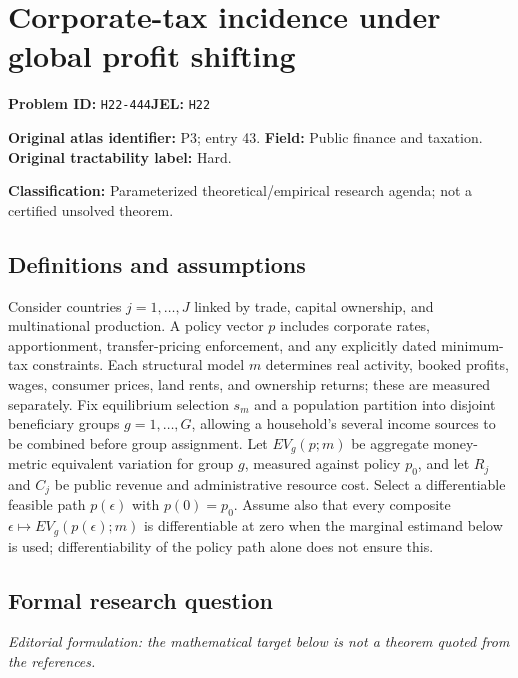 \documentclass[11pt,a4paper]{article}
\begin{document}
\section*{Corporate-tax incidence under global profit shifting}
\textbf{Problem ID:} \texttt{H22-444}\quad \textbf{JEL:} \texttt{H22}\par
\label{problem:OP-0043}
\label{atlas:prob:P3}
\noindent\textbf{Original atlas identifier:} P3; entry 43. \textbf{Field:} Public finance and taxation. \textbf{Original tractability label:} Hard.

\noindent\textbf{Classification:} Parameterized theoretical/empirical research agenda; not a certified unsolved theorem.

\subsection*{Definitions and assumptions}
Consider countries $j=1,\ldots,J$ linked by trade, capital ownership, and multinational production. A policy vector $p$ includes corporate rates, apportionment, transfer-pricing enforcement, and any explicitly dated minimum-tax constraints. Each structural model $m$ determines real activity, booked profits, wages, consumer prices, land rents, and ownership returns; these are measured separately. Fix equilibrium selection $s_m$ and a population partition into disjoint beneficiary groups $g=1,\ldots,G$, allowing a household's several income sources to be combined before group assignment. Let $EV_g(p;m)$ be aggregate money-metric equivalent variation for group $g$, measured against policy $p_0$, and let $R_j$ and $C_j$ be public revenue and administrative resource cost. Select a differentiable feasible path $p(\epsilon)$ with $p(0)=p_0$. Assume also that every composite $\epsilon\mapsto EV_g(p(\epsilon);m)$ is differentiable at zero when the marginal estimand below is used; differentiability of the policy path alone does not ensure this.

\subsection*{Formal research question}
\emph{Editorial formulation: the mathematical target below is not a theorem quoted from the references.}
\end{document}
